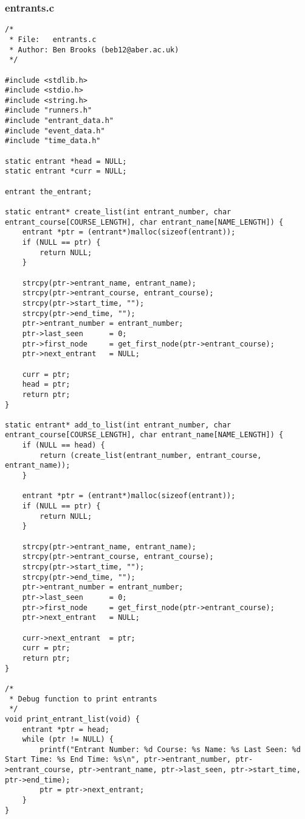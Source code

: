 \documentclass[pdftex,12pt,a4paper]{article}
\begin{document}
\subsubsection{entrants.c}
\begin{verbatim}
/*
 * File:   entrants.c
 * Author: Ben Brooks (beb12@aber.ac.uk)
 */

#include <stdlib.h>
#include <stdio.h>
#include <string.h>
#include "runners.h"
#include "entrant_data.h"
#include "event_data.h"
#include "time_data.h"

static entrant *head = NULL;
static entrant *curr = NULL;

entrant the_entrant;

static entrant* create_list(int entrant_number, char entrant_course[COURSE_LENGTH], char entrant_name[NAME_LENGTH]) {
    entrant *ptr = (entrant*)malloc(sizeof(entrant));
    if (NULL == ptr) {
        return NULL;
    }

    strcpy(ptr->entrant_name, entrant_name);
    strcpy(ptr->entrant_course, entrant_course);
    strcpy(ptr->start_time, "");
    strcpy(ptr->end_time, "");
    ptr->entrant_number = entrant_number;
    ptr->last_seen      = 0;
    ptr->first_node     = get_first_node(ptr->entrant_course);
    ptr->next_entrant   = NULL;

    curr = ptr;
    head = ptr;
    return ptr;
}

static entrant* add_to_list(int entrant_number, char entrant_course[COURSE_LENGTH], char entrant_name[NAME_LENGTH]) {
    if (NULL == head) {
        return (create_list(entrant_number, entrant_course, entrant_name));
    }

    entrant *ptr = (entrant*)malloc(sizeof(entrant));
    if (NULL == ptr) {
        return NULL;
    }

    strcpy(ptr->entrant_name, entrant_name);
    strcpy(ptr->entrant_course, entrant_course);
    strcpy(ptr->start_time, "");
    strcpy(ptr->end_time, "");
    ptr->entrant_number = entrant_number;
    ptr->last_seen      = 0;
    ptr->first_node     = get_first_node(ptr->entrant_course);
    ptr->next_entrant   = NULL;

    curr->next_entrant  = ptr;
    curr = ptr;
    return ptr;
}

/*
 * Debug function to print entrants
 */
void print_entrant_list(void) {
    entrant *ptr = head;
    while (ptr != NULL) {
        printf("Entrant Number: %d Course: %s Name: %s Last Seen: %d Start Time: %s End Time: %s\n", ptr->entrant_number, ptr->entrant_course, ptr->entrant_name, ptr->last_seen, ptr->start_time, ptr->end_time);
        ptr = ptr->next_entrant;
    }
}


\end{verbatim}
\end{document}
